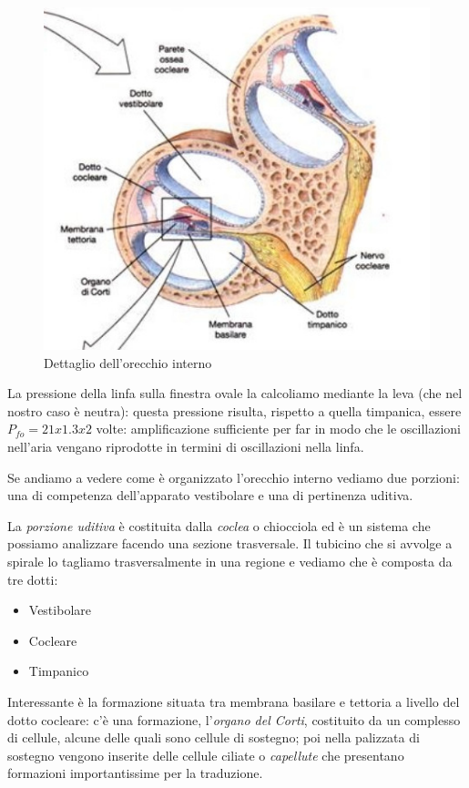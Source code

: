 \documentclass[a4paper,12pt]{article}
\begin{document}
\begin{figure}[H]
\centering
\includegraphics[scale=0.45]{immagine/corti.jpg}
\caption{Dettaglio dell'orecchio interno}
\end{figure}

La pressione della linfa sulla finestra ovale la calcoliamo mediante la leva (che nel nostro caso è neutra): questa pressione risulta, rispetto a quella timpanica, essere $P_{fo}=21x1.3x2$ volte: amplificazione sufficiente per far in modo che le oscillazioni nell'aria vengano riprodotte in termini di oscillazioni nella linfa. 

Se andiamo a vedere come è organizzato l'orecchio interno vediamo due porzioni: una di competenza dell'apparato vestibolare e una di pertinenza uditiva. 

La \emph{porzione uditiva} è costituita dalla \emph{coclea} o chiocciola ed è un sistema che possiamo analizzare facendo una sezione trasversale. Il tubicino che si avvolge a spirale lo tagliamo trasversalmente in una regione e vediamo che è composta da tre dotti: 

\begin{itemize}
\item{Vestibolare}
\item{Cocleare}
\item{Timpanico}
\end{itemize}

Interessante è la formazione situata tra membrana basilare e tettoria a livello del dotto cocleare: c'è una formazione, l'\emph{organo del Corti}, costituito da un complesso di cellule, alcune delle quali sono cellule di sostegno; poi nella palizzata di sostegno vengono inserite delle cellule ciliate o \emph{capellute} che presentano formazioni importantissime per la traduzione. 
\end{document}
